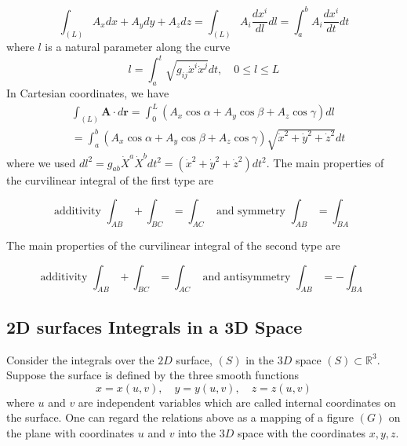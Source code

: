 \begin{equation}
\int_{(L)} A_{x} d x+A_{y} d y+A_{z} d z=\int_{(L)} A_{i} \frac{d x^{i}}{d l} d l=\int_{a}^{b} A_{i} \frac{d x^{i}}{d t} d t
\end{equation}
where $l$ is a natural parameter along the curve
$$
l=\int_{a}^{t} \sqrt{g_{i j} \dot{x}^{i} \dot{x}^{j}} d t, \quad 0 \leq l \leq L
$$
In Cartesian coordinates, we have
\begin{equation}
\begin{aligned}
&\int_{(L)} \mathbf{A} \cdot d \mathbf{r}=\int_{0}^{L}\left(A_{x} \cos \alpha+A_{y} \cos \beta+A_{z} \cos \gamma\right) d l\\
&=\int_{a}^{b}\left(A_{x} \cos \alpha+A_{y} \cos \beta+A_{z} \cos \gamma\right) \sqrt{\dot{x}^{2}+\dot{y}^{2}+\dot{z}^{2}} d t
\end{aligned}
\end{equation}
where we used $d l^{2}=g_{a b} \dot{X}^{a} \dot{X}^{b} d t^{2}=\left(\dot{x}^{2}+\dot{y}^{2}+\dot{z}^{2}\right) d t^{2}$.
The main properties of the curvilinear integral of the first type are
\begin{qt}
\[
\text { additivity } \int_{A B}+\int_{B C}=\int_{A C} \text { and symmetry } \int_{A B}=\int_{B A}
\]
\end{qt}
The main properties of the curvilinear integral of the second type are
\begin{qt}
\[
\text { additivity } \int_{A B}+\int_{B C}=\int_{A C} \text { and antisymmetry } \int_{A B}=-\int_{B A}
\]
\end{qt}

\subsection{2D surfaces Integrals in a 3D Space}
Consider the integrals over the $2 D$ surface, $(S)$ in the $3 D$ space $(S) \subset \mathbb{R}^{3} .$ Suppose the surface is defined by the three smooth functions
$$
x=x(u, v), \quad y=y(u, v), \quad z=z(u, v)
$$
where $u$ and $v$ are independent variables which are called internal coordinates on the surface. One can regard the relations above as a mapping of a figure $(G)$ on the plane with coordinates $u$ and $v$ into the $3 D$ space with the coordinates $x, y, z$. 

